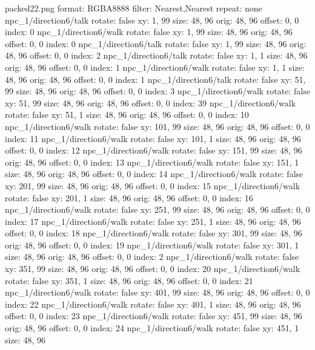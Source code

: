 packed22.png
format: RGBA8888
filter: Nearest,Nearest
repeat: none
npc_1/direction6/talk
  rotate: false
  xy: 1, 99
  size: 48, 96
  orig: 48, 96
  offset: 0, 0
  index: 0
npc_1/direction6/walk
  rotate: false
  xy: 1, 99
  size: 48, 96
  orig: 48, 96
  offset: 0, 0
  index: 0
npc_1/direction6/talk
  rotate: false
  xy: 1, 99
  size: 48, 96
  orig: 48, 96
  offset: 0, 0
  index: 2
npc_1/direction6/talk
  rotate: false
  xy: 1, 1
  size: 48, 96
  orig: 48, 96
  offset: 0, 0
  index: 1
npc_1/direction6/walk
  rotate: false
  xy: 1, 1
  size: 48, 96
  orig: 48, 96
  offset: 0, 0
  index: 1
npc_1/direction6/talk
  rotate: false
  xy: 51, 99
  size: 48, 96
  orig: 48, 96
  offset: 0, 0
  index: 3
npc_1/direction6/walk
  rotate: false
  xy: 51, 99
  size: 48, 96
  orig: 48, 96
  offset: 0, 0
  index: 39
npc_1/direction6/walk
  rotate: false
  xy: 51, 1
  size: 48, 96
  orig: 48, 96
  offset: 0, 0
  index: 10
npc_1/direction6/walk
  rotate: false
  xy: 101, 99
  size: 48, 96
  orig: 48, 96
  offset: 0, 0
  index: 11
npc_1/direction6/walk
  rotate: false
  xy: 101, 1
  size: 48, 96
  orig: 48, 96
  offset: 0, 0
  index: 12
npc_1/direction6/walk
  rotate: false
  xy: 151, 99
  size: 48, 96
  orig: 48, 96
  offset: 0, 0
  index: 13
npc_1/direction6/walk
  rotate: false
  xy: 151, 1
  size: 48, 96
  orig: 48, 96
  offset: 0, 0
  index: 14
npc_1/direction6/walk
  rotate: false
  xy: 201, 99
  size: 48, 96
  orig: 48, 96
  offset: 0, 0
  index: 15
npc_1/direction6/walk
  rotate: false
  xy: 201, 1
  size: 48, 96
  orig: 48, 96
  offset: 0, 0
  index: 16
npc_1/direction6/walk
  rotate: false
  xy: 251, 99
  size: 48, 96
  orig: 48, 96
  offset: 0, 0
  index: 17
npc_1/direction6/walk
  rotate: false
  xy: 251, 1
  size: 48, 96
  orig: 48, 96
  offset: 0, 0
  index: 18
npc_1/direction6/walk
  rotate: false
  xy: 301, 99
  size: 48, 96
  orig: 48, 96
  offset: 0, 0
  index: 19
npc_1/direction6/walk
  rotate: false
  xy: 301, 1
  size: 48, 96
  orig: 48, 96
  offset: 0, 0
  index: 2
npc_1/direction6/walk
  rotate: false
  xy: 351, 99
  size: 48, 96
  orig: 48, 96
  offset: 0, 0
  index: 20
npc_1/direction6/walk
  rotate: false
  xy: 351, 1
  size: 48, 96
  orig: 48, 96
  offset: 0, 0
  index: 21
npc_1/direction6/walk
  rotate: false
  xy: 401, 99
  size: 48, 96
  orig: 48, 96
  offset: 0, 0
  index: 22
npc_1/direction6/walk
  rotate: false
  xy: 401, 1
  size: 48, 96
  orig: 48, 96
  offset: 0, 0
  index: 23
npc_1/direction6/walk
  rotate: false
  xy: 451, 99
  size: 48, 96
  orig: 48, 96
  offset: 0, 0
  index: 24
npc_1/direction6/walk
  rotate: false
  xy: 451, 1
  size: 48, 96
